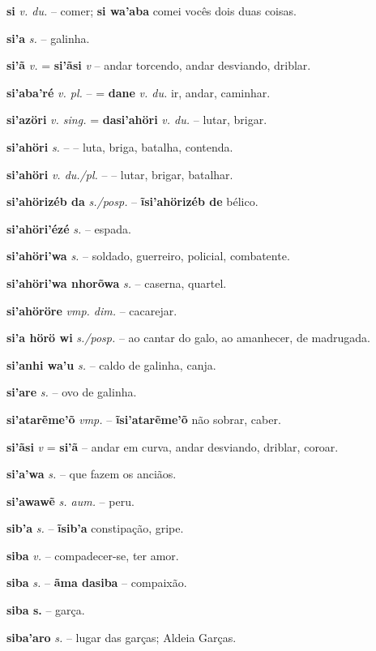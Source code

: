 \textbf{si} \textit{v. du.} -- comer; \textbf{si wa'aba} comei vocês dois duas coisas.

\textbf{si'a} \textit{s.} -- galinha.

\textbf{si'ã} \textit{v.} = \textbf{si'ãsi} \textit{v} -- andar torcendo, andar desviando, driblar.

\textbf{si'aba'ré} \textit{v. pl.} -- = \textbf{dane} \textit{v. du.} ir, andar, caminhar.

\textbf{si'azöri} \textit{v. sing.} = \textbf{dasi'ahöri} \textit{v. du.} -- lutar, brigar.

\textbf{si'ahöri} \textit{s.} -- -- luta, briga, batalha, contenda.

\textbf{si'ahöri} \textit{v. du./pl.} -- -- lutar, brigar, batalhar.

\textbf{si'ahörizéb da} \textit{s./posp.} -- \textbf{ĩsi'ahörizéb de} bélico.

\textbf{si'ahöri'ézé} \textit{s.} -- espada.

\textbf{si'ahöri'wa} \textit{s.} -- soldado, guerreiro, policial, combatente.

\textbf{si'ahöri'wa nhorõwa} \textit{s.} -- caserna, quartel.

\textbf{si'ahöröre} \textit{vmp. dim.} -- cacarejar.

\textbf{si'a hörö wi} \textit{s./posp.} -- ao cantar do galo, ao amanhecer, de madrugada.

\textbf{si'anhi wa'u} \textit{s.} -- caldo de galinha, canja.

\textbf{si'are} \textit{s.} -- ovo de galinha.

\textbf{si'atarẽme'õ} \textit{vmp.} -- \textbf{ĩsi'atarẽme'õ} não sobrar, caber.

\textbf{si'ãsi} \textit{v} = \textbf{si'ã} -- andar em curva, andar desviando, driblar, coroar.

\textbf{si'a'wa} \textit{s.} -- que fazem os anciãos.

\textbf{si'awawẽ} \textit{s. aum.} -- peru.

\textbf{sib'a} \textit{s.} -- \textbf{ĩsib'a} constipação, gripe.

\textbf{siba} \textit{v.} -- compadecer-se, ter amor.

\textbf{siba} \textit{s.} -- \textbf{ãma dasiba} -- compaixão.

\textbf{siba s.} -- garça.

\textbf{siba'aro} \textit{s.} -- lugar das garças; Aldeia Garças.

